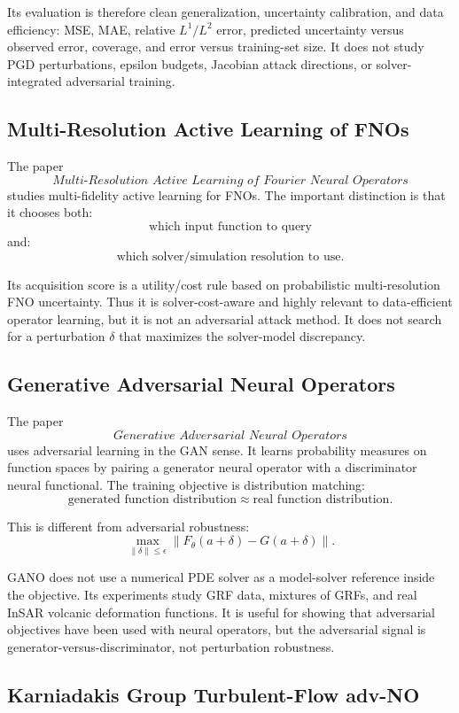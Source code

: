 \documentclass{article}
\begin{document}
Its evaluation is therefore clean generalization, uncertainty calibration, and
data efficiency: MSE, MAE, relative \(L^1/L^2\) error, predicted uncertainty
versus observed error, coverage, and error versus training-set size. It does
not study PGD perturbations, epsilon budgets, Jacobian attack directions, or
solver-integrated adversarial training.

\subsection{Multi-Resolution Active Learning of FNOs}

The paper
\[
\textit{Multi-Resolution Active Learning of Fourier Neural Operators}
\]
studies multi-fidelity active learning for FNOs. The important distinction is
that it chooses both:
\[
\text{which input function to query}
\]
and:
\[
\text{which solver/simulation resolution to use}.
\]

Its acquisition score is a utility/cost rule based on probabilistic
multi-resolution FNO uncertainty. Thus it is solver-cost-aware and highly
relevant to data-efficient operator learning, but it is not an adversarial
attack method. It does not search for a perturbation \(\delta\) that maximizes
the solver-model discrepancy.

\subsection{Generative Adversarial Neural Operators}

The paper
\[
\textit{Generative Adversarial Neural Operators}
\]
uses adversarial learning in the GAN sense. It learns probability measures on
function spaces by pairing a generator neural operator with a discriminator
neural functional. The training objective is distribution matching:
\[
\text{generated function distribution}
\approx
\text{real function distribution}.
\]

This is different from adversarial robustness:
\[
\max_{\|\delta\|\leq\epsilon}
\|F_\theta(a+\delta)-G(a+\delta)\|.
\]

GANO does not use a numerical PDE solver as a model-solver reference inside
the objective. Its experiments study GRF data, mixtures of GRFs, and real
InSAR volcanic deformation functions. It is useful for showing that
adversarial objectives have been used with neural operators, but the
adversarial signal is generator-versus-discriminator, not perturbation
robustness.

\subsection{Karniadakis Group Turbulent-Flow adv-NO}
\end{document}
